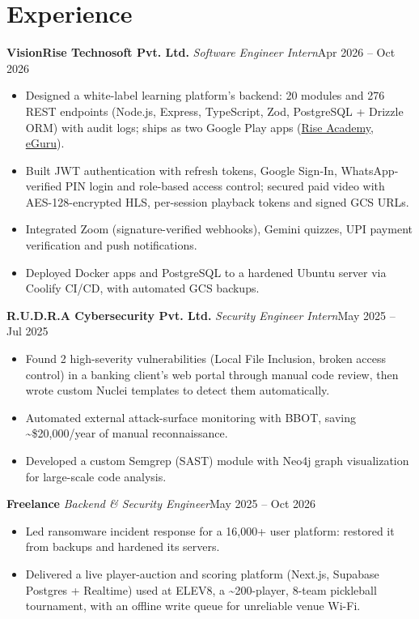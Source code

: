 \documentclass[10pt, a4paper]{article}
\newcommand{\role}[3]{\par\vspace{2.5pt}\textbf{#1} \textbar{} \textit{#2}\hfill #3\par}
\newcommand{\lnk}[2]{\href{#1}{\color{linkc}#2}}
\begin{document}
\section{Experience}
\role{VisionRise Technosoft Pvt. Ltd.}{Software Engineer Intern}{Apr 2026 -- Oct 2026}
\begin{itemize}
  \item Designed a white-label learning platform's backend: 20 modules and 276 REST endpoints (Node.js, Express,
  TypeScript, Zod, PostgreSQL + Drizzle ORM) with audit logs; ships as two Google Play apps (\lnk{https://play.google.com/store/apps/details?id=tech.riseinstitute.app}{Rise Academy}, \lnk{https://play.google.com/store/apps/details?id=app.eguru.lms}{eGuru}).
  \item Built JWT authentication with refresh tokens, Google Sign-In, WhatsApp-verified PIN login and role-based access control;
  secured paid video with AES-128-encrypted HLS, per-session playback tokens and signed GCS URLs.
  \item Integrated Zoom (signature-verified webhooks), Gemini quizzes, UPI payment verification and push notifications.
  \item Deployed Docker apps and PostgreSQL to a hardened Ubuntu server via Coolify CI/CD, with automated GCS backups.
\end{itemize}

\role{R.U.D.R.A Cybersecurity Pvt. Ltd.}{Security Engineer Intern}{May 2025 -- Jul 2025}
\begin{itemize}
  \item Found 2 high-severity vulnerabilities (Local File Inclusion, broken access control) in a banking client's web
  portal through manual code review, then wrote custom Nuclei templates to detect them automatically.
  \item Automated external attack-surface monitoring with BBOT, saving \textasciitilde{}\$20,000/year of manual reconnaissance.
  \item Developed a custom Semgrep (SAST) module with Neo4j graph visualization for large-scale code analysis.
\end{itemize}

\role{Freelance}{Backend \& Security Engineer}{May 2025 -- Oct 2026}
\begin{itemize}
  \item Led ransomware incident response for a 16,000+ user platform: restored it from backups and hardened its servers.
  \item Delivered a live player-auction and scoring platform (Next.js, Supabase Postgres + Realtime) used at ELEV8, a
  \textasciitilde{}200-player, 8-team pickleball tournament, with an offline write queue for unreliable venue Wi-Fi.
\end{itemize}
\end{document}
